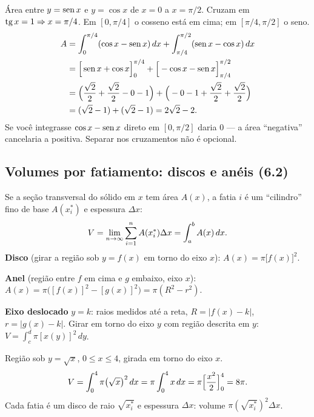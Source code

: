 \begin{exemplo}
Área entre $y=\operatorname{sen} x$ e $y=\cos x$ de $x=0$ a $x=\pi/2$. Cruzam em $\operatorname{tg} x=1\Rightarrow x=\pi/4$. Em $[0,\pi/4]$ o cosseno está em cima; em $[\pi/4,\pi/2]$ o seno.
\begin{align*}
A&=\int_0^{\pi/4}(\cos x-\operatorname{sen} x)\,dx+\int_{\pi/4}^{\pi/2}(\operatorname{sen} x-\cos x)\,dx\\
&=\Big[\operatorname{sen} x+\cos x\Big]_0^{\pi/4}+\Big[-\cos x-\operatorname{sen} x\Big]_{\pi/4}^{\pi/2}\\
&=\Big(\frac{\sqrt2}{2}+\frac{\sqrt2}{2}-0-1\Big)+\Big(-0-1+\frac{\sqrt2}{2}+\frac{\sqrt2}{2}\Big)\\
&=(\sqrt2-1)+(\sqrt2-1)=2\sqrt2-2 .
\end{align*}
Se você integrasse $\cos x-\operatorname{sen} x$ direto em $[0,\pi/2]$ daria $0$ --- a área ``negativa'' cancelaria a positiva. Separar nos cruzamentos não é opcional.
\end{exemplo}

\subsection{Volumes por fatiamento: discos e anéis (6.2)}

\begin{definicao}
Se a seção transversal do sólido em $x$ tem área $A(x)$, a fatia $i$ é um ``cilindro'' fino de base $A(x_i^*)$ e espessura $\Delta x$:
\[
V=\lim_{n\to\infty}\sum_{i=1}^n A(x_i^*)\Delta x=\int_a^b A(x)\,dx .
\]
\textbf{Disco} (girar a região sob $y=f(x)$ em torno do eixo $x$): $A(x)=\pi\big[f(x)\big]^2$.

\textbf{Anel} (região entre $f$ em cima e $g$ embaixo, eixo $x$): $A(x)=\pi\big([f(x)]^2-[g(x)]^2\big)=\pi(R^2-r^2)$.

\textbf{Eixo deslocado} $y=k$: raios medidos até a reta, $R=|f(x)-k|$, $r=|g(x)-k|$. Girar em torno do eixo $y$ com região descrita em $y$: $V=\int_c^d\pi[x(y)]^2\,dy$.
\end{definicao}

\begin{exemplo}
Região sob $y=\sqrt x$, $0\le x\le4$, girada em torno do eixo $x$.
\[
V=\int_0^4\pi\big(\sqrt x\big)^2\,dx=\pi\int_0^4x\,dx=\pi\Big[\frac{x^2}{2}\Big]_0^4=8\pi .
\]
Cada fatia é um disco de raio $\sqrt{x_i^*}$ e espessura $\Delta x$: volume $\pi(\sqrt{x_i^*})^2\Delta x$.
\end{exemplo}


